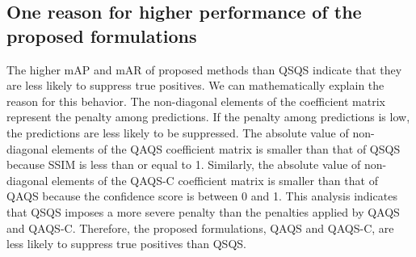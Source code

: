 \subsection{One reason for higher performance of the proposed formulations}
The higher mAP and mAR of proposed methods than QSQS indicate that they are less likely to suppress true positives. We can mathematically explain the reason for this behavior.
The non-diagonal elements of the coefficient matrix represent the penalty among predictions. If the penalty among predictions is low, the predictions are less likely to be suppressed.
The absolute value of non-diagonal elements of the QAQS coefficient matrix is smaller than that of QSQS because SSIM is less than or equal to 1.
Similarly, the absolute value of non-diagonal elements of the QAQS-C coefficient matrix is smaller than that of QAQS because the confidence score is between 0 and 1.
This analysis indicates that QSQS imposes a more severe penalty than the penalties applied by QAQS and QAQS-C.
Therefore, the proposed formulations, QAQS and QAQS-C, are less likely to suppress true positives than QSQS.

